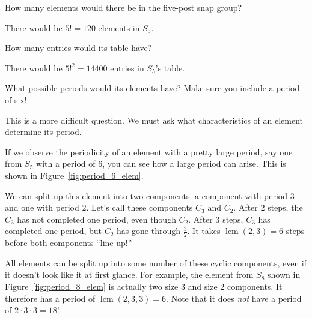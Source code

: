 \documentclass[../gatm_answers.tex]{subfiles}
\begin{document}
\begin{outer_problem}
	\item
\end{outer_problem}

\begin{inner_problem}[start=1]
	 \item How many elements would there be in the five-post snap group? \label{prob:five_post_snap_list_start}
\end{inner_problem}

\noindent There would be $5!=120$ elements in $S_5$.

\begin{inner_problem}
	\item How many entries would its table have?
\end{inner_problem}

\noindent There would be $5!^2=14400$ entries in $S_5$'s table.

\begin{inner_problem}
	\item What possible periods would its elements have? Make sure you include a period of six! \label{prob:five_post_snap_list_end}
\end{inner_problem}

\noindent This is a more difficult question. We must ask what characteristics of an element determine its period.

If we observe the periodicity of an element with a pretty large period, say one from $S_5$ with a period of $6$, you can see how a large period can arise. This is shown in Figure~\ref{fig:period_6_elem}.

We can split up this element into two components: a component with period $3$ and one with period $2$. Let's call these components $C_3$ and $C_2$. After $2$ steps, the $C_3$ has not completed one period, even though $C_2$. After $3$ steps, $C_3$ has completed one period, but $C_2$ has gone through $\frac{3}{2}$. It takes $\operatorname{lcm}(2,3) = 6$ steps before both components ``line up!''

All elements can be split up into some number of these cyclic components, even if it doesn't look like it at first glance. For example, the element from $S_8$ shown in Figure~\ref{fig:period_8_elem} is actually two size $3$ and size $2$ components. It therefore has a period of $\operatorname{lcm}(2,3,3)=6$. Note that it does \textit{not} have a period of $2\cdot 3\cdot 3 = 18$!
\end{document}
